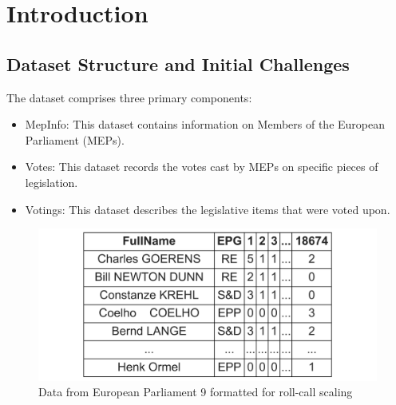 \documentclass[a4paper,12pt]{report}
\begin{document}
    \tableofcontents


    \chapter{Introduction}



    \section{Dataset Structure and Initial Challenges}

    The dataset comprises three primary components:


    \begin{itemize}
        \item MepInfo: This dataset contains information on Members of the European Parliament (MEPs).
        \item Votes: This dataset records the votes cast by MEPs on specific pieces of legislation.
        \item Votings: This dataset describes the legislative items that were voted upon.
    \end{itemize}
    \begin{figure}[htb]
        \centering
        \includegraphics[width=1\textwidth]{Graphs/short_table9}
        \caption{Data from European Parliament 9 formatted for roll-call scaling}
        \label{fig:Structure table}
    \end{figure}
\end{document}
